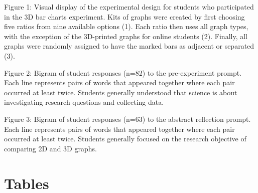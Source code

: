 \documentclass[
  12pt,
]{article}
\providecommand{\DIFdel}[1]{} %
\providecommand{\DIFadd}[1]{{\protect\color{blue} \sf #1}} %
\providecommand{\DIFdel}[1]{{\protect\color{red} [..\footnote{removed: #1} ]}} %
\providecommand{\DIFaddbegin}{} %
\providecommand{\DIFaddend}{} %
\providecommand{\DIFdelbegin}{} %
\providecommand{\DIFdelend}{} %
\newcommand{\DIFscaledelfig}{0.5}
\newlength{\DIFdelgraphicswidth} %
\newlength{\DIFdelgraphicsheight} %
\newcommand{\DIFaddincludegraphics}[2][]{{\color{blue}\fbox{\DIFOincludegraphics[#1]{#2}}}} %
\newcommand{\DIFdelincludegraphics}[2][]{%
\sbox{\DIFdelgraphicsbox}{\DIFOincludegraphics[#1]{#2}}%
\settoboxwidth{\DIFdelgraphicswidth}{\DIFdelgraphicsbox} %
\settoboxtotalheight{\DIFdelgraphicsheight}{\DIFdelgraphicsbox} %
\scalebox{\DIFscaledelfig}{%
\parbox[b]{\DIFdelgraphicswidth}{\usebox{\DIFdelgraphicsbox}\\[-\baselineskip] \rule{\DIFdelgraphicswidth}{0em}}\llap{\resizebox{\DIFdelgraphicswidth}{\DIFdelgraphicsheight}{%
\setlength{\unitlength}{\DIFdelgraphicswidth}%
\begin{picture}(1,1)%
\thicklines\linethickness{2pt} %
{\color[rgb]{1,0,0}\put(0,0){\framebox(1,1){}}}%
{\color[rgb]{1,0,0}\put(0,0){\line( 1,1){1}}}%
{\color[rgb]{1,0,0}\put(0,1){\line(1,-1){1}}}%
\end{picture}%
}\hspace*{3pt}}} %
} %
\DeclareRobustCommand{\DIFaddbegin}{\DIFOaddbegin \let\includegraphics\DIFaddincludegraphics} %
\DeclareRobustCommand{\DIFaddend}{\DIFOaddend \let\includegraphics\DIFOincludegraphics} %
\DeclareRobustCommand{\DIFdelbegin}{\DIFOdelbegin \let\includegraphics\DIFdelincludegraphics} %
\DeclareRobustCommand{\DIFdelend}{\DIFOaddend \let\includegraphics\DIFOincludegraphics} %
\begin{document}
Figure 1: Visual display of the experimental design for students who
participated in the 3D bar charts experiment. Kits of graphs were
created by first choosing five ratios from nine available options (1).
Each ratio then uses all graph types, with the exception of the
\DIFdelbegin \DIFdel{3D
printed }\DIFdelend \DIFaddbegin \DIFadd{3D-printed }\DIFaddend graphs for online students (2). Finally, all graphs were
randomly assigned to have the marked bars as adjacent or separated (3).

Figure 2: Bigram of student responses \DIFaddbegin \DIFadd{(n=82) }\DIFaddend to the pre-experiment
prompt. Each line represents pairs of words that appeared together where
each pair occurred at least twice. Students generally understood that
science is about investigating research questions and collecting data.

Figure 3: Bigram of student responses \DIFaddbegin \DIFadd{(n=63) }\DIFaddend to the abstract reflection
prompt. Each line represents pairs of words that appeared together where
each pair occurred at least twice. Students generally \DIFdelbegin \DIFdel{understood that science
is about investigating research questions and collecting data}\DIFdelend \DIFaddbegin \DIFadd{focused on the
research objective of comparing 2D and 3D graphs}\DIFaddend .

\newpage

\section{Tables}\label{tables}
\end{document}
